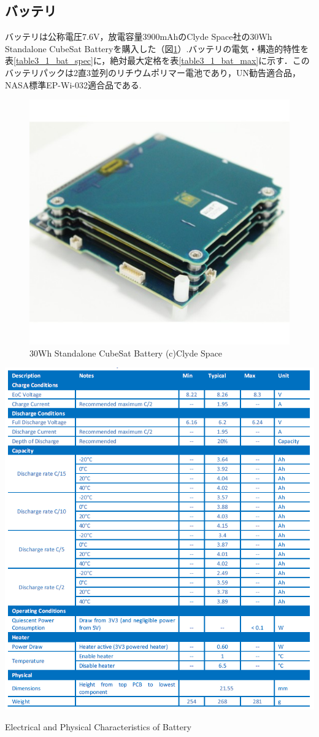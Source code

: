 \subsection{バッテリ}
バッテリは公称電圧7.6V，放電容量3900mAhのClyde Space社の30Wh Standalone CubeSat Batteryを購入した（図\ref{fig3_1_bat}）.バッテリの電気・構造的特性を表\ref{table3_1_bat_spec}に，絶対最大定格を表\ref{table3_1_bat_max}に示す．このバッテリパックは2直3並列のリチウムポリマー電池であり，UN勧告適合品，NASA標準EP-Wi-032適合品である.

\begin{figure}[htbp]
	\begin{center}
		\includegraphics[width=0.5\linewidth]{./03/fig/battery.jpg}
		\caption{30Wh Standalone CubeSat Battery (c)Clyde Space}
		\label{fig3_1_bat}
	\end{center}
\end{figure}

\begin{table}[htbp]
	\begin{center}
		\includegraphics[width=0.9\linewidth]{./03/fig/battery_spec.png}
		\caption{Electrical and Physical Characteristics of Battery \cite{bat_um}}
		\label{table3_1_bat_spec}
	\end{center}
\end{table}


